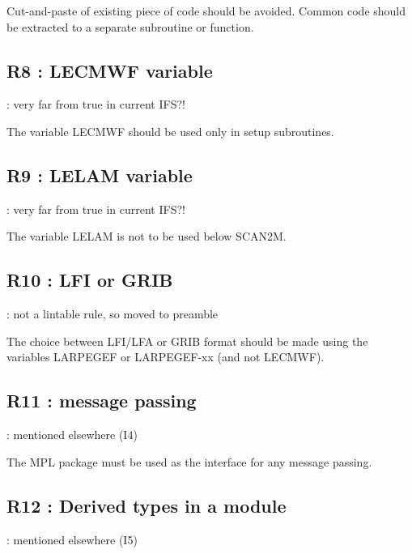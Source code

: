 \documentclass[letterpaper,10pt,english]{sphinxmanual}
\begin{document}
Cut-and-paste  of  existing  piece  of  code  should  be  avoided.
Common  code should be extracted to a separate subroutine or function.


\subsection{R8 :  LECMWF variable}
\label{\detokenize{obsolescent/r8:r8-lecmwf-variable}}\label{\detokenize{obsolescent/r8::doc}}
 : very far from true in current IFS?!

The variable LECMWF should be used only in setup subroutines.


\subsection{R9 : LELAM variable}
\label{\detokenize{obsolescent/r9:r9-lelam-variable}}\label{\detokenize{obsolescent/r9::doc}}
 : very far from true in current IFS?!

The variable LELAM is not to be used below SCAN2M.


\subsection{R10 :  LFI or GRIB}
\label{\detokenize{obsolescent/r10:r10-lfi-or-grib}}\label{\detokenize{obsolescent/r10::doc}}
 : not a lintable rule, so moved to preamble

The  choice between  LFI/LFA  or  GRIB  format  should  be  made  using  the variables
LARPEGEF or LARPEGEF-xx (and not LECMWF).


\subsection{R11 :  message passing}
\label{\detokenize{obsolescent/r11:r11-message-passing}}\label{\detokenize{obsolescent/r11::doc}}
 : mentioned elsewhere (I4)

The MPL package must be used as the interface for any message passing.


\subsection{R12 :  Derived types in a module}
\label{\detokenize{obsolescent/r12:r12-derived-types-in-a-module}}\label{\detokenize{obsolescent/r12::doc}}
 : mentioned elsewhere (I5)
\end{document}
